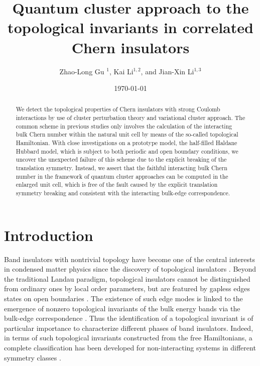 \documentclass[12pt]{iopart}
\begin{document}
\title[Topological invariants in correlated Chern insulators]{Quantum cluster approach to the topological invariants in correlated Chern insulators}

\author{Zhao-Long Gu $^1$, Kai Li$^{1,2}$, and Jian-Xin Li$^{1,3}$}
\address{$^1$ National Laboratory of Solid State Microstructures and Department of Physics, Nanjing University, Nanjing 210093, China}
\address{$^2$ School of Physics and Engineering, Zhengzhou University, Zhengzhou 450001, China}
\address{$^3$ Collaborative Innovation Center of Advanced Microstructures, Nanjing University, Nanjing 210093, China}
\date{\today}

\begin{abstract}
\par We detect the topological properties of Chern insulators with strong Coulomb interactions by use of cluster perturbation theory and variational cluster approach. The common scheme in previous studies only involves the calculation of the interacting bulk Chern number within the natural unit cell by means of the so-called topological Hamiltonian. With close investigations on a prototype model, the half-filled Haldane Hubbard model, which is subject to both periodic and open boundary conditions, we uncover the unexpected failure of this scheme due to the explicit breaking of the translation symmetry. Instead, we assert that the faithful interacting bulk Chern number in the framework of quantum cluster approaches can be computed in the enlarged unit cell, which is free of the fault caused by the explicit translation symmetry breaking and consistent with the interacting bulk-edge correspondence.

\end{abstract}

\submitto{\NJP}
\maketitle

\section{Introduction}

\par Band insulators with nontrivial topology have become one of the central interests in condensed matter physics since the discovery of topological insulators \cite{HK_RMP2010,QZ_RMP2011}. Beyond the traditional Landau paradigm, topological insulators cannot be distinguished from ordinary ones by local order parameters, but are featured by gapless edges states on open boundaries \cite{H_PRL1988,K_PU2001,KM_PRL2005,BHZ_S2006,LYGJ_PRB2016,LGLW_NJP2017}. The existence of such edge modes is linked to the emergence of nonzero topological invariants of the bulk energy bands via the bulk-edge correspondence \cite{QWZ_PRB2006}. Thus the identification of a topological invariant is of particular importance to characterize different phases of band insulators. Indeed, in terms of such topological invariants constructed from the free Hamiltonians, a complete classification has been developed for non-interacting systems in different symmetry classes \cite{SRFL_PRB2008,CTSR_RMP2016}.
\end{document}
